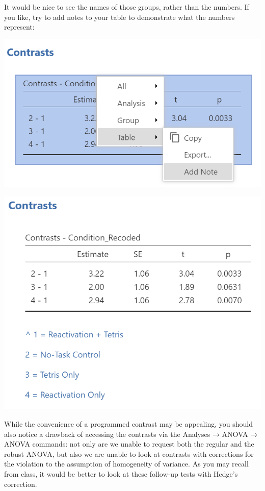 \documentclass[
]{book}
\begin{document}
It would be nice to see the names of those groups, rather than the numbers. If you like, try to add notes to your table to demonstrate what the numbers represent:

\includegraphics{img/AddingNotesToResultsTables.png}

\includegraphics{img/AddingNotesToResultsTables2.png}

While the convenience of a programmed contrast may be appealing, you should also notice a drawback of accessing the contrasts via the {Analyses} → {ANOVA} → {ANOVA} commands: not only are we unable to request both the regular and the robust ANOVA, but also we are unable to look at contrasts with corrections for the violation to the assumption of homogeneity of variance. As you may recall from class, it would be better to look at these follow-up tests with Hedge's correction.
\end{document}
